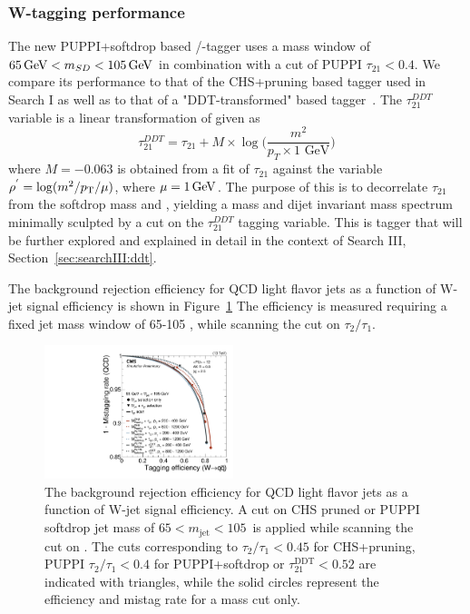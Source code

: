 \subsubsection{W-tagging performance}
The new PUPPI+softdrop based \PW/\PZ-tagger uses a mass window of $65 \,\text{Ge\hspace{-.08em}V} < m_{SD} < 105 \,\text{Ge\hspace{-.08em}V}$ in combination with a cut of PUPPI $\tau_{21}<0.4$.
We compare its performance to that of the CHS+pruning based tagger used in Search I as well as to that of a "DDT-transformed" \nsubj based tagger~\cite{Dolen:2016kst}. The $\tau_{21}^{DDT}$ variable is a linear transformation of \nsubj given as
\begin{equation}
\tau_{21}^{DDT} = \tau_{21} + M \times \log \bigg( \frac{m^2}{p_T \times 1 \textrm{ GeV}}\bigg)
\end{equation}
where $M=-0.063$ is obtained from a fit of $\tau_{21}$ against the variable $\rho^{'}=\log(m^2/p_{\mathrm{T}}/\mu)$, where $\mu = 1 \,\text{Ge\hspace{-.08em}V}$.
The purpose of this is to decorrelate $\tau_{21}$ from the softdrop mass and \PT, yielding a mass and dijet invariant mass spectrum minimally sculpted by
a cut on the $\tau_{21}^{DDT}$ tagging variable. This is tagger that will be further explored and explained in detail in the context of Search III, Section~\ref{sec:searchIII:ddt}.\par
The background rejection efficiency for QCD light flavor jets as a function of W-jet signal efficiency is shown in Figure~\ref{fig:searchII:roc}
The efficiency is measured requiring a fixed jet mass window of 65-105 \GeV, while scanning the cut on $\tau_2/\tau_1$.
\begin{figure}[ht!]
\centering
\includegraphics[width=0.49\textwidth]{figures/vtagging/JME-16-003/BoostedW/roc_WqqvsQCD_2bins.pdf}
\caption{The background rejection efficiency for QCD light flavor jets as a function of W-jet signal efficiency. A cut on CHS pruned or PUPPI softdrop jet
mass of $65<m_{\mathrm{jet}}<105$~\GeV is applied while scanning the cut on \nsubj. The cuts corresponding to $\tau_2/\tau_1 < 0.45$ for CHS+pruning, PUPPI $\tau_2/\tau_1 < 0.4$ for PUPPI+softdrop or $\tau_{21}^\text{DDT}<0.52$ are indicated with triangles, while the solid circles represent the efficiency and mistag rate for a mass cut only.}
\label{fig:searchII:roc}
\end{figure}
